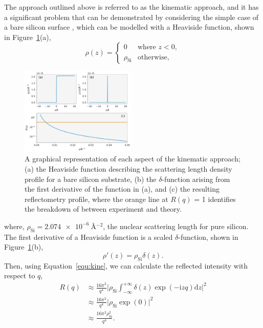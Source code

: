 \documentclass[
 reprint,
 superscriptaddress,
 amsmath,amssymb,
 aps,
]{revtex4-1}
\begin{document}
The approach outlined above is referred to as the kinematic approach, and it has a significant problem that can be demonstrated by considering the simple case of a bare silicon surface \cite{sivia_elementary_2011}, which can be modelled with a Heaviside function, shown in Figure~\ref{fig:kine}(a),
%
\begin{equation}
    \rho(z) = 
    \begin{cases}
        0 & \text{where } z < 0,\\
        \rho_{\text{Si}} & \text{otherwise},
    \end{cases}
\end{equation}
%
%
\begin{figure}[t]
    \includegraphics[width=0.49\textwidth]{kine}
    \caption{A graphical representation of each aspect of the kinematic approach; (a) the Heaviside function describing the scattering length density profile for a bare silicon substrate, (b) the $\delta$-function arising from the first derivative of the function in (a), and (c) the resulting reflectometry profile, where the orange line at $R(q)$ = 1 identifies the breakdown of between experiment and theory.}
    \label{fig:kine}
\end{figure}
%
where, $\rho_{\text{Si}} = \SI{2.074e-6}{\angstrom^{-2}}$, the nuclear scattering length for pure silicon. 
The first derivative of a Heaviside function is a scaled $\delta$-function, shown in Figure~\ref{fig:kine}(b), 
%
\begin{equation}
    \rho'(z) = \rho_{\text{Si}}\delta(z).
\end{equation}
%
Then, using Equation~\ref{equ:kine}, we can calculate the reflected intensity with respect to $q$, 
%
\begin{equation}
    \begin{aligned}
    R(q) & \approx \frac{16\pi^2}{q^4} \bigg| \rho_{\text{Si}}\int^{+\infty}_{-\infty}{\delta(z)\exp{(-\mathrm{i} zq) \text{d}z}} \bigg|^2 \\ 
     & \approx \frac{16\pi^2}{q^4} \bigg| \rho_{\text{Si}} \exp{(0)} \bigg| ^2 \\
     & \approx \frac{16\pi^2\rho_{\text{Si}}^2}{q^4}.
    \end{aligned}
    \label{equ:baresi}
\end{equation}
\end{document}

